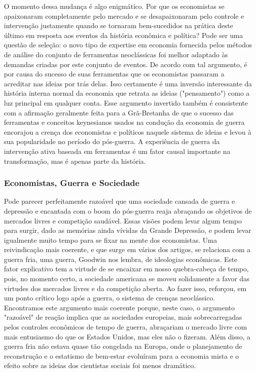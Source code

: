 \documentclass[a4paper,12pt]{article}[abntex2]
\begin{document}
O momento dessa mudança é algo enigmático. Por que os economistas se apaixonaram completamente pelo mercado e se desapaixonaram pelo controle e intervenção justamente quando se tornaram bem-sucedidos na prática deste último em resposta aos eventos da história econômica e política? Pode ser uma questão de seleção: o novo tipo de expertise em economia fornecida pelos métodos de análise do conjunto de ferramentas neoclássicas foi melhor adaptado às demandas criadas por este conjunto de eventos. De acordo com tal argumento, é por causa do sucesso de suas ferramentas que os economistas passaram a acreditar nas ideias por trás delas. Isso certamente é uma inversão interessante da história interna normal da economia que retrata as ideias ("pensamento") como a luz principal em qualquer conta. Esse argumento invertido também é consistente com a afirmação geralmente feita para a Grã-Bretanha de que o sucesso das ferramentas e conceitos keynesianos usados na condução da economia de guerra encorajou a crença dos economistas e políticos naquele sistema de ideias e levou à sua popularidade no período do pós-guerra. A experiência de guerra da intervenção ativa baseada em ferramentas é um fator causal importante na transformação, mas é apenas parte da história.

\subsubsection{\textbf{Economistas, Guerra e Sociedade}}

Pode parecer perfeitamente razoável que uma sociedade cansada de guerra e depressão e encantada com o boom do pós-guerra reaja abraçando os objetivos de mercados livres e competição saudável. Essas visões podem levar algum tempo para surgir, dado as memórias ainda vívidas da Grande Depressão, e podem levar igualmente muito tempo para se fixar na mente dos economistas. Uma reivindicação mais coerente, e que surge em vários dos artigos, se relaciona com a guerra fria, uma guerra, Goodwin nos lembra, de ideologias econômicas. Este fator explicativo tem a virtude de se encaixar em nosso quebra-cabeça de tempo, pois, no momento certo, a sociedade americana se moveu solidamente a favor das virtudes dos mercados livres e da competição aberta. Ao fazer isso, reforçou, em um ponto crítico logo após a guerra, o sistema de crenças neoclássico. Encontramos este argumento mais coerente porque, neste caso, o argumento "razoável" de reação implica que as sociedades europeias, mais sobrecarregadas pelos controles econômicos de tempo de guerra, abraçariam o mercado livre com mais entusiasmo do que os Estados Unidos, mas eles não o fizeram. Além disso, a guerra fria não estava quase tão congelada na Europa, onde o planejamento de reconstrução e o estatismo de bem-estar evoluíram para a economia mista e o efeito sobre as ideias dos cientistas sociais foi menos dramático.
\end{document}
